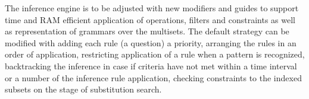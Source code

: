 \documentclass[conference,a4paper]{IEEEtran}
\begin{document}
The inference engine is to be adjusted with new modifiers and guides to support time and RAM efficient application of operations, filters and constraints as well as representation of grammars over the multisets. The default strategy can be modified with adding each rule (a question) a priority, arranging the rules in an order of application, restricting application of a rule when a pattern is recognized, backtracking the inference in case if criteria have not met within a time interval or a number of the inference rule application, checking constraints to the indexed subsets on the stage of substitution search.




\end{document}

